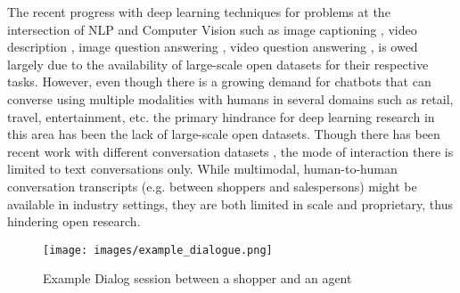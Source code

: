 \documentclass[letterpaper]{article} %
\begin{document}
The recent progress with deep learning techniques for problems at the intersection of NLP and Computer Vision such as image captioning \cite{cap2}, video description \cite{DBLP:conf/cvpr/YuWHYX16}, image question answering \cite{vqa-visual-question-answering}, video question answering \cite{DBLP:journals/corr/ZengCCLNS16,DBLP:journals/corr/MaharajBCP16}, is owed largely due to the availability of large-scale open datasets for their respective tasks. However, even though there is a growing demand for chatbots that can converse using multiple modalities with humans in several domains such as retail, travel, entertainment, etc. the primary hindrance for deep learning research in this area has been the lack of large-scale open datasets. 
Though there has been recent work \cite{DBLP:journals/corr/SerbanSLCPCB16,DBLP:journals/corr/YaoPZW16,Serban:2016:BED:3016387.3016435} with different conversation datasets \cite{DBLP:conf/sigdial/LowePSP15,DBLP:journals/corr/VinyalsL15,DBLP:conf/naacl/RitterCD10}, the mode of interaction there is limited to text conversations only.
While multimodal, human-to-human conversation transcripts (e.g. between shoppers and salespersons) might be available in industry settings, they are both limited in scale and proprietary, thus hindering open research.
\begin{figure*}[!ht]
  \texttt{[image: images/example\_dialogue.png]}
   \caption{\label{fig:dialogue} Example Dialog session between a shopper and an agent}

\end{figure*}
\end{document}
